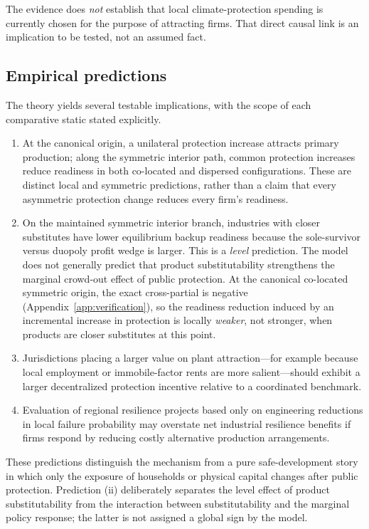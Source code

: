 The evidence does \emph{not} establish that local climate-protection spending is currently chosen for the purpose of attracting firms. That direct causal link is an implication to be tested, not an assumed fact.

\subsection{Empirical predictions}

The theory yields several testable implications, with the scope of each comparative static stated explicitly.
\begin{enumerate}[label=(\roman*)]
\item At the canonical origin, a unilateral protection increase attracts primary production; along the symmetric interior path, common protection increases reduce readiness in both co-located and dispersed configurations. These are distinct local and symmetric predictions, rather than a claim that every asymmetric protection change reduces every firm's readiness.
\item On the maintained symmetric interior branch, industries with closer substitutes have lower equilibrium backup readiness because the sole-survivor versus duopoly profit wedge is larger. This is a \emph{level} prediction. The model does not generally predict that product substitutability strengthens the marginal crowd-out effect of public protection. At the canonical co-located symmetric origin, the exact cross-partial is negative (Appendix~\ref{app:verification}), so the readiness reduction induced by an incremental increase in protection is locally \emph{weaker}, not stronger, when products are closer substitutes at this point.
\item Jurisdictions placing a larger value on plant attraction---for example because local employment or immobile-factor rents are more salient---should exhibit a larger decentralized protection incentive relative to a coordinated benchmark.
\item Evaluation of regional resilience projects based only on engineering reductions in local failure probability may overstate net industrial resilience benefits if firms respond by reducing costly alternative production arrangements.
\end{enumerate}
These predictions distinguish the mechanism from a pure safe-development story in which only the exposure of households or physical capital changes after public protection. Prediction (ii) deliberately separates the level effect of product substitutability from the interaction between substitutability and the marginal policy response; the latter is not assigned a global sign by the model.
